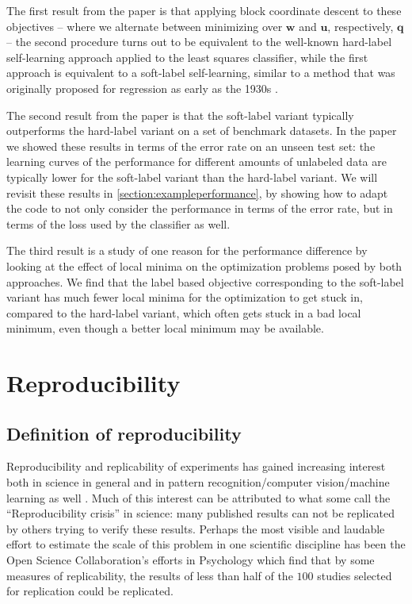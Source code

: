 \documentclass[runningheads,a4paper]{llncs}\usepackage[]{graphicx}\usepackage[]{color}
\begin{document}
The first result from the paper is that applying block coordinate descent to these objectives -- where we alternate between minimizing over $\mathbf{w}$ and $\mathbf{u}$, respectively, $\mathbf{q}$ -- the second procedure turns out to be equivalent to the well-known hard-label self-learning approach applied to the least squares classifier, while the first approach is equivalent to a soft-label self-learning, similar to a method that was originally proposed for regression as early as the 1930s \cite{Healy1956}.

The second result from the paper is that the soft-label variant typically outperforms the hard-label variant on a set of benchmark datasets. In the paper we showed these results in terms of the error rate on an unseen test set: the learning curves of the performance for different amounts of unlabeled data are typically lower for the soft-label variant than the hard-label variant. We will revisit these results in \cref{section:exampleperformance}, by showing how to adapt the code to not only consider the performance in terms of the error rate, but in terms of the loss used by the classifier as well.

The third result is a study of one reason for the performance difference by looking at the effect of local minima on the optimization problems posed by both approaches. We find that the label based objective corresponding to the soft-label variant has much fewer local minima for the optimization to get stuck in, compared to the hard-label variant, which often gets stuck in a bad local minimum, even though a better local minimum may be available.

\section{Reproducibility}

\subsection{Definition of reproducibility}
Reproducibility and replicability of experiments has gained increasing interest both in science in general \cite{Goodman2016a} and in pattern recognition/computer vision/machine learning as well \cite{Drummond2009}. Much of this interest can be attributed to what some call the ``Reproducibility crisis'' in science: many published results can not be replicated by others trying to verify these results. Perhaps the most visible and laudable effort to estimate the scale of this problem in one scientific discipline has been the Open Science Collaboration's efforts in Psychology \cite{OpenScienceCollaboration2015} which find that by some measures of replicability, the results of less than half of the $100$ studies selected for replication could be replicated.
\end{document}
